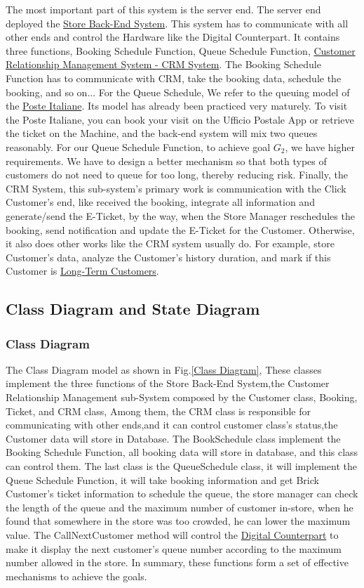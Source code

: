 \documentclass[a4paper,12pt]{report}
\begin{document}
The most important part of this system is the server end. The server end deployed the \hyperref[Definitions]{Store Back-End System}. This system has to communicate with all other ends and control the Hardware like the Digital Counterpart. It contains three functions, Booking Schedule Function, Queue Schedule Function, \hyperref[Reference documents]{Customer Relationship Management System - CRM System}. The Booking Schedule Function has to communicate with CRM, take the booking data, schedule the booking, and so on... For the Queue Schedule, We refer to the queuing model of the \hyperref[Reference documents]{Poste Italiane}. Its model has already been practiced very maturely. To visit the Poste Italiane, you can book your visit on the Ufficio Postale App or retrieve the ticket on the Machine, and the back-end system will mix two queues reasonably. For our Queue Schedule Function, to achieve goal $G_2$, we have higher requirements. We have to design a better mechanism so that both types of customers do not need to queue for too long, thereby reducing risk. Finally, the CRM System, this sub-system's primary work is communication with the Click Customer's end, like received the booking, integrate all information and generate/send the E-Ticket, by the way, when the Store Manager reschedules the booking, send notification and update the E-Ticket for the Customer. Otherwise, it also does other works like the CRM system usually do. For example, store Customer's data, analyze the Customer's history duration, and mark if this Customer is  \hyperref[Definitions]{Long-Term Customers}.


\subsection{Class Diagram and State Diagram}
\subsubsection{Class Diagram}
The Class Diagram model as shown in Fig.\ref{Class Diagram}, These classes implement the three functions of the Store Back-End System,the Customer Relationship Management sub-System composed by the  Customer class, Booking, Ticket, and CRM class, Among them, the CRM class is responsible for communicating with other ends,and it can control customer class's status,the Customer data will store in Database. The BookSchedule class implement the Booking Schedule Function, all booking data will store in database, and this class can control them. The last class is the QueueSchedule class, it will implement the Queue Schedule Function, it will take booking information and get Brick Customer's ticket information to schedule the queue, the store manager can check the length of the queue and the maximum number of customer in-store, when he found that somewhere in the store was too crowded, he can lower the maximum value. The CallNextCustomer method will control the \hyperref[Definitions]{Digital Counterpart} to make it display the next customer's queue number according to the maximum number allowed in the store. In summary, these functions form a set of effective mechanisms to achieve the goals.
\end{document}
